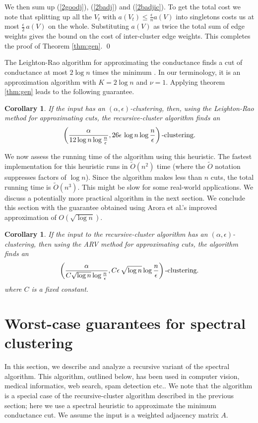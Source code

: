 \documentclass{book}
\newtheorem{corollary}[theorem]{Corollary}
\numberwithin{exercise}{chapter}
\begin{document}
We then sum up (\ref{2goodj}), (\ref{2badj}) and (\ref{2badjic}). To get
the total cost we note that
splitting up all the $V_t$ with $a(V_t)\leq \frac{\epsilon}{n} a(V)$ into
singletons costs us at most $\frac{\epsilon}{2}\, a(V)$ on the whole.
Substituting $a(V)$ as twice the total sum of edge weights gives
the bound on the
cost of inter-cluster edge weights. This completes the proof of Theorem \ref{thm:gen}.
\qed

The Leighton-Rao algorithm for approximating the conductance finds a cut
of conductance at most $2\log n$ times the minimum \cite{LR99}. In our
terminology, it is an approximation algorithm with $K=2\log n$ and $\nu =1$.
Applying theorem \ref{thm:gen} leads to the following guarantee.

\begin{corollary}\label{cor:LR}
If the input has an $(\alpha, \epsilon)$-clustering, then,
using the Leighton-Rao method for approximating cuts, the recursive-cluster algorithm
finds an
\[
\left(\frac{\alpha}{12 \log n\log \frac{n}{\epsilon}}, 26\epsilon\,\log n\log \frac{n}{\epsilon}\right)\mbox{-clustering}.
\]
\end{corollary}

We now assess the running time of the algorithm using this heuristic.
The fastest implementation for this heuristic runs in $\tilde{O}(n^2)$ time
(where the $\tilde{O}$ notation suppresses factors of $\log n$).
Since  the algorithm makes less than $n$ cuts, the total running
time is $\tilde{O}(n^3)$.
This might be slow for some real-world applications.
We discuss a potentially more practical algorithm in the next section.
We conclude this section with the guarantee obtained using Arora et al.'s improved approximation \cite{ARV04} of $O(\sqrt{\log n})$.
\begin{corollary}\label{cor:ARV}
If the input to the recursive-cluster algorithm has an $(\alpha, \epsilon)$-clustering, then using the ARV method for approximating cuts, the algorithm finds an
\[
\left(\frac{\alpha}{C \sqrt{\log n}\log \frac{n}{\epsilon}}, C\epsilon\,\sqrt{\log n}\log \frac{n}{\epsilon} \right)\mbox{-clustering}.
\]
where $C$ is a fixed constant.
\end{corollary}


\section{Worst-case guarantees for spectral clustering}\label{sec:spectral2}
In this section, we describe and analyze a recursive variant
of the spectral algorithm. This algorithm, outlined below, has been
used in computer vision, medical informatics,
web search, spam detection etc..
We note that the algorithm is
a special case of the recursive-cluster algorithm described in
the previous section; here we use a spectral heuristic to approximate
the minimum conductance cut. We assume the input is a weighted adjacency matrix $A$.
\end{document}
